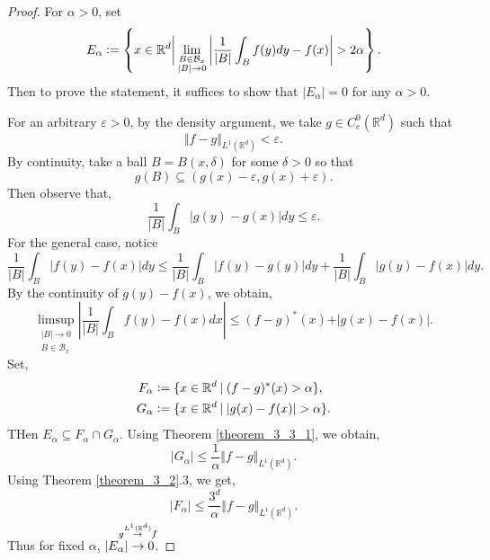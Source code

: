 \documentclass[8pt]{article}
\newcommand{\norm}[1]{\Vert #1 \Vert}
\newcommand{\ab}[1]{\vert #1 \vert}
\newcommand{\sep}[0]{\:\vert\:}
\newcommand{\defeq}{\vcentcolon=}
\newcommand{\bR}[0]{\mathbb{R}}
\newcommand{\cB}[0]{\mathcal{B}}
\begin{document}
\begin{proof}
  For $\alpha>0$, set
  \begin{equation*}
    E_\alpha \defeq\left\{x\in\bR^d\bigg{\vert}\lim_{\substack{B\in\cB_x\\ \ab{B}\to 0}}\left\vert{\frac 1 {\ab{B}}}\int_Bf(y)dy - f(x)\right\vert>2\alpha\right\}.
  \end{equation*}
  Then to prove the statement, it suffices to show that $\ab{E_\alpha}=0$ for any $\alpha>0$.
  \par For an arbitrary $\varepsilon>0$, by the density argument, we take $g\in C_c^0(\bR^d)$ such that 
  \begin{equation*}
    \norm{f-g}_{L^1(\bR^d)}<\varepsilon.
  \end{equation*}
  By continuity, take a ball $B = B(x,\delta)$ for some $\delta>0$ so that 
  \begin{equation*}
    g(B)\subseteq (g(x)-\varepsilon,g(x)+\varepsilon).
  \end{equation*}
  Then observe that,
  \begin{equation*}
    {\frac 1 {\ab{B}}}\int_B\ab{g(y)-g(x)}dy \leq\varepsilon.
  \end{equation*}
  For the general case, notice 
  \begin{equation*}
   {\frac 1 {\ab{B}}}\int_B\ab{f(y)-f(x)}dy\leq {\frac 1 {\ab{B}}}\int_B\ab{f(y)-g(y)}dy+{\frac 1 {\ab{B}}}\int_B\ab{g(y)-f(x)}dy.
  \end{equation*}
  By the continuity of $g(y)-f(x)$, we obtain,
  \begin{equation*}
    \limsup_{\substack{\ab{B}\to 0\\ B\in\cB_x}}\left\vert{\frac 1 {\ab{B}}}\int_Bf(y)-f(x)dx\right\vert \leq (f-g)^*(x) + \ab{g(x)-f(x)}.
  \end{equation*}
  Set,
  \begin{align*}
    F_\alpha &\defeq\{x\in\bR^d\sep (f-g)^*(x)>\alpha\},\\
    G_\alpha &\defeq\{x\in\bR^d\sep \ab{g(x)-f(x)}>\alpha\}.
  \end{align*}
  THen $E_\alpha\subseteq F_\alpha\cap G_\alpha$. Using Theorem \ref{theorem_3_3_1}, we obtain,
  \begin{equation*}
    \ab{G_\alpha}\leq {\frac 1 \alpha}\norm{f-g}_{L^1(\bR^d)}.
  \end{equation*}
  Using Theorem \ref{theorem_3_2}.3, we get,
  \begin{equation*}
    \ab{F_\alpha}\leq{\frac {3^d} \alpha}\norm{f-g}_{L^1(\bR^d)}.
  \end{equation*}
  Thus for fixed $\alpha$, $\ab{E_\alpha}\stackrel{\substack{\mathmakebox[0pt][c]{g\stackrel{L^1(\bR^d)}{\to}f}\\\:}}{\to}0$.
\end{proof}
\end{document}
